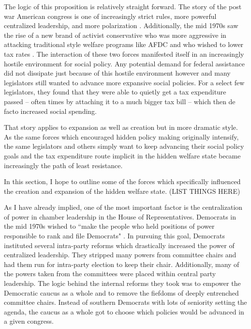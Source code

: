 \documentclass[12pt]{article}
\begin{document}
The logic of this proposition is relatively straight forward. The story of the post war American congress is one of increasingly strict rules, more powerful centralized leadership, and more polarization \citep{rohde1991, binder2003, koger2010}. Additionally, the mid 1970s saw the rise of a new brand of activist conservative who was more aggressive in attacking traditional style welfare programs like AFDC and who wished to lower tax rates \citep{hacker2007}. The interaction of these two forces manifested itself in an increasingly hostile environment for social policy. Any potential demand for federal assistance did not dissipate just because of this hostile environment however and many legislators still wanted to advance more expansive social policies. For a select few legislators, they found that they were able to quietly get a tax expenditure passed -- often times by attaching it to a much bigger tax bill -- which then de facto increased social spending. 

That story applies to expansion as well as creation but in more dramatic style. As the same forces which encouraged hidden policy making originally intensify, the same legislators and others simply want to keep advancing their social policy goals and the tax expenditure route implicit in the hidden welfare state became increasingly the path of least resistance. 

In this section, I hope to outline some of the forces which specifically influenced the creation and expansion of the hidden welfare state.  (LIST THINGS HERE)

As I have already implied, one of the most important factor is the centralization of power in chamber leadership in the House of Representatives. Democrats in the mid 1970s wished to ``make the people who held positions of power responsible to rank and file Democrats" \citep[pg. 26, quote spoken by Rep. Donald Fraser (D-MN)]{rohde1991}. In pursuing this goal, Democrats instituted several intra-party reforms which drastically increased the power of centralized leadership. They stripped many powers from committee chairs and had them run for intra-party election to keep their chair. Additionally, many of the powers taken from the committees were placed within central party leadership. The logic behind the internal reforms they took was to empower the Democratic caucus as a whole and to remove the fiefdoms of deeply entrenched committee chairs. Instead of southern Democrats with lots of seniority setting the agenda, the caucus as a whole got to choose which policies would be advanced in a given congress. 
\end{document}
